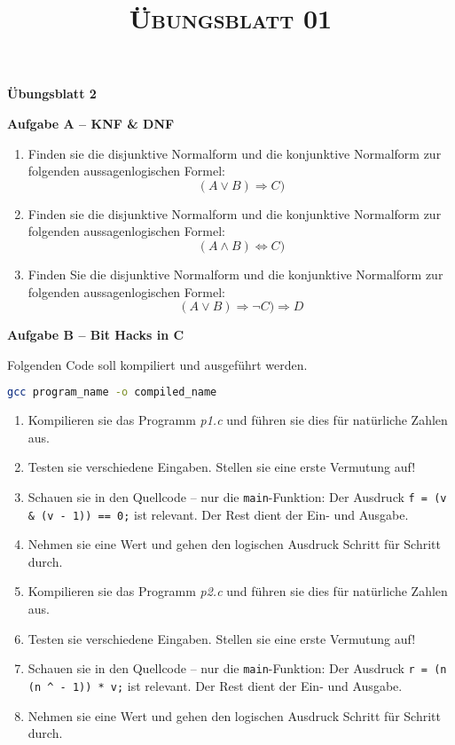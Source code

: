 \documentclass[paper=a4,fontsize=11pt]{scrartcl}%
\title{	
\normalfont \normalsize 
\textsc{Übungsblatt 01}
}
\numberwithin{equation}{section}
\begin{document}
\vspace*{-1cm}
\begin{center}
\Large{\textbf{Übungsblatt 2}}
\end{center}

\begin{center}\Large{\textbf{Aufgabe A -- KNF \& DNF}}\end{center}

\begin{enumerate}
	\item Finden sie die disjunktive Normalform und die konjunktive Normalform zur folgenden aussagenlogischen Formel:
	$$ 
		(A \lor B) \Rightarrow C)
	$$ 
	\item Finden sie die disjunktive Normalform und die konjunktive Normalform zur folgenden aussagenlogischen Formel: 
	$$
	(A \land B) \Leftrightarrow C)
	$$
	\item Finden Sie die disjunktive Normalform und die konjunktive Normalform zur folgenden aussagenlogischen Formel: 
	$$
	(A \lor B) \Rightarrow \neg C) \Rightarrow D
	$$
\end{enumerate}

\begin{center}\Large{\textbf{Aufgabe B -- Bit Hacks in C}}\end{center}
	Folgenden Code soll kompiliert und ausgeführt werden.
	\begin{lstlisting}[style=Bash, language=Bash]
gcc program_name -o compiled_name
\end{lstlisting}
	\begin{enumerate}
		\item Kompilieren sie das Programm \emph{p1.c} und führen sie dies für natürliche Zahlen aus.
		\item Testen sie verschiedene Eingaben. Stellen sie eine erste Vermutung auf!
		\item Schauen sie in den Quellcode -- nur die \texttt{main}-Funktion: Der Ausdruck \texttt{f = (v \& (v - 1)) == 0;} ist relevant. Der Rest dient der Ein- und Ausgabe.
		\item Nehmen sie eine Wert und gehen den logischen Ausdruck Schritt für Schritt durch.
		
		\item Kompilieren sie das Programm \emph{p2.c} und führen sie dies für natürliche Zahlen aus.
		\item Testen sie verschiedene Eingaben. Stellen sie eine erste Vermutung auf!
		\item Schauen sie in den Quellcode -- nur die \texttt{main}-Funktion: Der Ausdruck \texttt{r = (n  (n \string^  - 1)) * v;} ist relevant. Der Rest dient der Ein- und Ausgabe.
		
		\item Nehmen sie eine Wert und gehen den logischen Ausdruck Schritt für Schritt durch.
	\end{enumerate}
	
\end{document}
